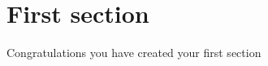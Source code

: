 \section{First section}
\label{introduction:first_section}
Congratulations you have created your first section
